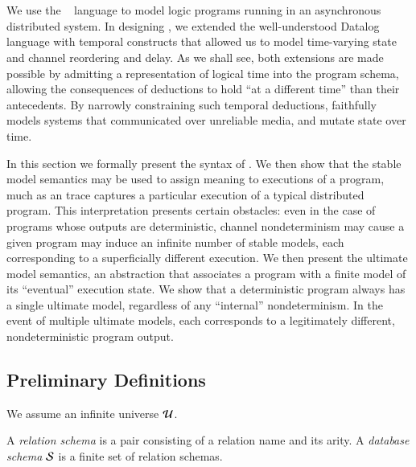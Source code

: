 \section{\large \bf \lang}
\label{sec:foundation}

We use the \lang~\cite{dedalus} language to model logic programs running in an asynchronous distributed system.
In designing \lang, we extended the well-understood Datalog language with temporal constructs that allowed
us to model time-varying state and channel reordering and delay.  As we shall see, both extensions are made
possible by admitting a representation of logical time into the program schema, allowing the consequences of
deductions to hold ``at a different time'' than their antecedents.  By narrowly constraining such temporal 
deductions, \lang faithfully models systems that communicated over unreliable media, and mutate state over time.

In this section we formally present the syntax of \lang.  We then show that the stable model semantics may be
used to assign meaning to executions of a \lang program, much as an trace captures a particular execution of a
typical distributed program.  
This interpretation presents certain obstacles:
even in the case of programs whose outputs are deterministic, channel nondeterminism may cause a given program 
may induce an infinite number of stable models, each corresponding to a superficially different execution.
We then present the ultimate model semantics, an abstraction that associates a program with a finite model of 
its ``eventual'' execution state.  We show that a deterministic program always has a single ultimate model,
regardless of any ``internal'' nondeterminism.  In the event of multiple ultimate models, each corresponds to a
legitimately different, nondeterministic program output.


\subsection{Preliminary Definitions}


We assume an infinite universe $\univ$.

A {\em relation schema} is a pair consisting of a relation name and its arity.
A {\em database schema} $\schema$ is a finite set of relation schemas.

